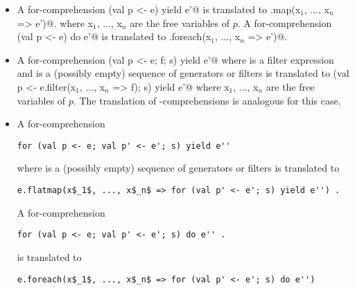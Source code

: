 \documentclass[11pt]{report}
\newcommand{\ifnewfor}[1]{}
\begin{document}
\ifnewfor{
First, a definition: A pattern $P$ is a {\em binding} if $P$ is a
variable pattern or a tuple pattern consisting only of pattern
variables. In the following, we let $B$ range over bindings, $P$ over
patterns other than bindings, $E, F$ over expressions, and $G$ over
enumerators.

If
$x_1 \commadots x_n$ are the free variables of $p$, then
the generator \verb@p <- e@ is translated to:
\begin{verbatim}
$(x_1 \commadots x_n)$ <- e.filter(case p => True case _ => False).map(case p => $(x_1 \commadots x_n)$)
\end{verbatim}

A generator \verb@P <- E@ followed by a filter \verb@F@ is translated to
a single generator \verb@P <- E.filter(x_1 \commadots x_n => F)@.

The comprehension \verb@for (B <- E) E'@ is translated to
\verb@E.map(B => E')@.

The comprehension \verb@for (B <- E, G) E'@ is translated to
\begin{verbatim}
(val x$\Dollar$ = E ; x$\Dollar$.combine(for (B <- E) for (G) E'))
\end{verbatim}

}
\begin{itemize}
\item
A for-comprehension
\verb@for (val p <- e) yield e'@
is translated to
\verb@e.map(x$_1$, ..., x$_n$ => e')@.
where x$_1$, ..., x$_n$ are the free variables of $p$.
A for-comprehension
\verb@for (val p <- e) do e'@
is translated to
\verb@e.foreach(x$_1$, ..., x$_n$ => e')@.
\item
A for-comprehension
\verb@for (val p <- e; f; s) yield e'@
where \verb@f@ is a filter expression and \verb@s@ is a (possibly empty)
sequence of generators or filters
is translated to
\verb@for (val p <- e.filter(x$_1$, ..., x$_n$ => f); s) yield e'@
where x$_1$, ..., x$_n$ are the free variables of $p$. The translation
of \verb@for@-\verb@do@ comprehensions is analogous for this case.
\item
A for-comprehension
\begin{verbatim}
for (val p <- e; val p' <- e'; s) yield e''
\end{verbatim}
where \verb@s@ is a (possibly empty)
sequence of generators or filters
is translated to
\begin{verbatim}
e.flatmap(x$_1$, ..., x$_n$ => for (val p' <- e'; s) yield e'') .
\end{verbatim}
A for-comprehension
\begin{verbatim}
for (val p <- e; val p' <- e'; s) do e'' .
\end{verbatim}
is translated to
\begin{verbatim}
e.foreach(x$_1$, ..., x$_n$ => for (val p' <- e'; s) do e'')
\end{verbatim}
\end{itemize}
\end{document}
